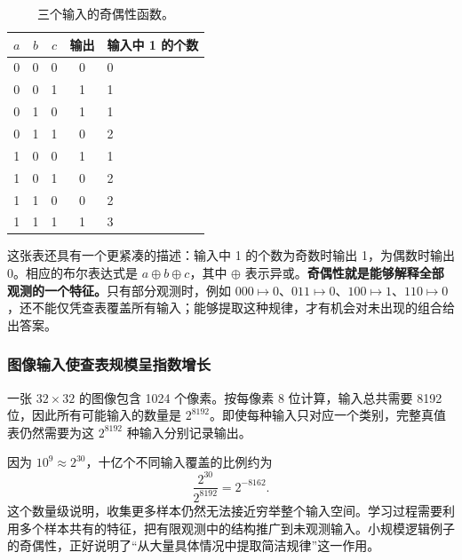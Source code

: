 \begin{table}[H]
\centering
\caption{三个输入的奇偶性函数。}
\label{l10:tab:parity}
\begin{tabular}{cccc@{\qquad}l}
\toprule
$a$ & $b$ & $c$ & 输出 & 输入中 1 的个数\\
\midrule
0&0&0&0&0\\
0&0&1&1&1\\
0&1&0&1&1\\
0&1&1&0&2\\
1&0&0&1&1\\
1&0&1&0&2\\
1&1&0&0&2\\
1&1&1&1&3\\
\bottomrule
\end{tabular}
\end{table}

这张表还具有一个更紧凑的描述：输入中 1 的个数为奇数时输出 1，为偶数时输出 0。相应的布尔表达式是 $a\oplus b\oplus c$，其中 $\oplus$ 表示异或。\textbf{奇偶性就是能够解释全部观测的一个特征。}只有部分观测时，例如 $000\mapsto0$、$011\mapsto0$、$100\mapsto1$、$110\mapsto0$，还不能仅凭查表覆盖所有输入；能够提取这种规律，才有机会对未出现的组合给出答案。

\subsubsection{图像输入使查表规模呈指数增长}
一张 $32\times32$ 的图像包含 1024 个像素。按每像素 8 位计算，输入总共需要 8192 位，因此所有可能输入的数量是 $2^{8192}$。即使每种输入只对应一个类别，完整真值表仍然需要为这 $2^{8192}$ 种输入分别记录输出。

因为 $10^9\approx2^{30}$，十亿个不同输入覆盖的比例约为
\begin{equation}
\frac{2^{30}}{2^{8192}}=2^{-8162}.
\label{l10:eq:coverage}
\end{equation}
这个数量级说明，收集更多样本仍然无法接近穷举整个输入空间。学习过程需要利用多个样本共有的特征，把有限观测中的结构推广到未观测输入。小规模逻辑例子的奇偶性，正好说明了“从大量具体情况中提取简洁规律”这一作用。
